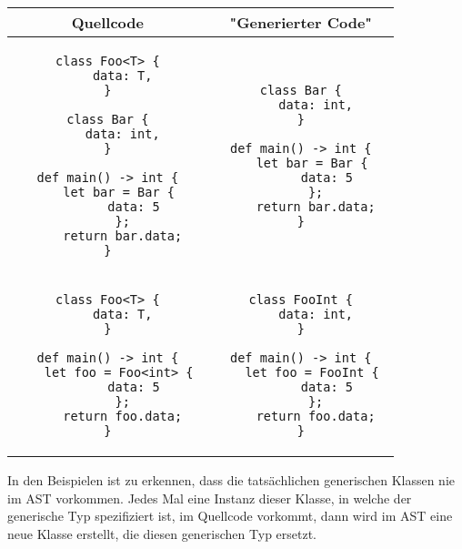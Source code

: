         \begin{center}
            \begin{tabular}{c|c}
                Quellcode & "Generierter Code" \\
                \hline
                \begin{minipage}{0.45\textwidth}
                    \begin{lstlisting}
class Foo<T> {
    data: T,
}

class Bar {
    data: int,
}
        
def main() -> int {
    let bar = Bar { 
        data: 5 
    };
    return bar.data;
}
            \end{lstlisting}
        \end{minipage} &
        \begin{minipage}{0.45\textwidth}
            \begin{lstlisting}
class Bar {
    data: int,
}
        
def main() -> int {
    let bar = Bar { 
        data: 5 
    };
    return bar.data;
}
                    \end{lstlisting}
                \end{minipage} \\
                \hline
                \begin{minipage}{0.45\textwidth}
                    \begin{lstlisting}
class Foo<T> {
    data: T,
}
        
def main() -> int {
    let foo = Foo<int> { 
        data: 5 
    };
    return foo.data;
}
                    \end{lstlisting}
                \end{minipage} &
                \begin{minipage}{0.45\textwidth}
                    \begin{lstlisting}
class FooInt {
    data: int,
}
        
def main() -> int {
    let foo = FooInt { 
        data: 5 
    };
    return foo.data;
}
                    \end{lstlisting}
                \end{minipage} \\
                \hline
            \end{tabular}
        \end{center}


        In den Beispielen ist zu erkennen, dass die tatsächlichen generischen Klassen nie im 
        AST vorkommen. Jedes Mal eine Instanz dieser Klasse, in welche der generische 
        Typ spezifiziert ist, im Quellcode vorkommt, dann wird im AST eine neue Klasse erstellt, die diesen generischen Typ ersetzt.


